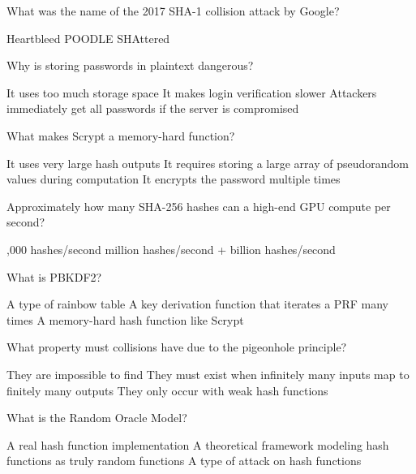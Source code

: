 \documentclass[10pt,a4paper,american]{exam}
\begin{document}
\begin{questions}
	\question What was the name of the 2017 SHA-1 collision attack by Google?
	\begin{randomizechoices}
		\choice Heartbleed
		\choice POODLE
		\CorrectChoice SHAttered
	\end{randomizechoices}

	\question Why is storing passwords in plaintext dangerous?
	\begin{randomizechoices}
		\choice It uses too much storage space
		\choice It makes login verification slower
		\CorrectChoice Attackers immediately get all passwords if the server is compromised
	\end{randomizechoices}

	\question What makes Scrypt a memory-hard function?
	\begin{randomizechoices}
		\choice It uses very large hash outputs
		\CorrectChoice It requires storing a large array of pseudorandom values during computation
		\choice It encrypts the password multiple times
	\end{randomizechoices}

	\question Approximately how many SHA-256 hashes can a high-end GPU compute per second?
	\begin{randomizechoices}
		,000 hashes/second
		 million hashes/second
		+ billion hashes/second
	\end{randomizechoices}

	\question What is PBKDF2?
	\begin{randomizechoices}
		\choice A type of rainbow table
		\CorrectChoice A key derivation function that iterates a PRF many times
		\choice A memory-hard hash function like Scrypt
	\end{randomizechoices}

	\question What property must collisions have due to the pigeonhole principle?
	\begin{randomizechoices}
		\choice They are impossible to find
		\CorrectChoice They must exist when infinitely many inputs map to finitely many outputs
		\choice They only occur with weak hash functions
	\end{randomizechoices}

	\question What is the Random Oracle Model?
	\begin{randomizechoices}
		\choice A real hash function implementation
		\CorrectChoice A theoretical framework modeling hash functions as truly random functions
		\choice A type of attack on hash functions
	\end{randomizechoices}


\end{questions}
\end{document}
